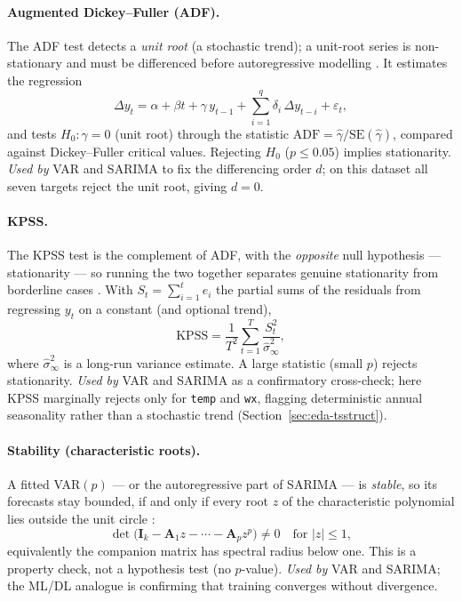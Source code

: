 \documentclass[12pt,a4paper,oneside]{report}
\begin{document}
\paragraph{Augmented Dickey--Fuller (ADF).}
The ADF test detects a \emph{unit root} (a stochastic trend); a unit-root series is
non-stationary and must be differenced before autoregressive modelling
\citep{hamilton1994time}. It estimates the regression
\begin{equation}
  \Delta y_t = \alpha + \beta t + \gamma\, y_{t-1}
  + \sum_{i=1}^{q} \delta_i\,\Delta y_{t-i} + \varepsilon_t,
  \label{eq:adf}
\end{equation}
and tests $H_0\!:\gamma = 0$ (unit root) through the statistic
$\mathrm{ADF} = \hat\gamma / \mathrm{SE}(\hat\gamma)$, compared against
Dickey--Fuller critical values. Rejecting $H_0$ ($p \le 0.05$) implies stationarity.
\emph{Used by} VAR and SARIMA to fix the differencing order $d$; on this dataset all
seven targets reject the unit root, giving $d=0$.

\paragraph{KPSS.}
The KPSS test is the complement of ADF, with the \emph{opposite} null hypothesis ---
stationarity --- so running the two together separates genuine stationarity from
borderline cases \citep{hyndman2021fpp}. With $S_t = \sum_{i=1}^{t} \hat e_i$ the
partial sums of the residuals from regressing $y_t$ on a constant (and optional
trend),
\begin{equation}
  \mathrm{KPSS} = \frac{1}{T^2}\sum_{t=1}^{T} \frac{S_t^2}{\hat\sigma^2_{\infty}},
  \label{eq:kpss}
\end{equation}
where $\hat\sigma^2_{\infty}$ is a long-run variance estimate. A large statistic
(small $p$) rejects stationarity. \emph{Used by} VAR and SARIMA as a confirmatory
cross-check; here KPSS marginally rejects only for \texttt{temp} and \texttt{wx},
flagging deterministic annual seasonality rather than a stochastic trend
(Section~\ref{sec:eda-tsstruct}).

\paragraph{Stability (characteristic roots).}
A fitted VAR$(p)$ --- or the autoregressive part of SARIMA --- is \emph{stable}, so
its forecasts stay bounded, if and only if every root $z$ of the characteristic
polynomial lies outside the unit circle \citep{lutkepohl2005var}:
\begin{equation}
  \det\!\big(\mathbf{I}_k - \mathbf{A}_1 z - \cdots - \mathbf{A}_p z^p\big) \neq 0
  \quad\text{for } |z| \le 1,
  \label{eq:stability}
\end{equation}
equivalently the companion matrix has spectral radius below one. This is a property
check, not a hypothesis test (no $p$-value). \emph{Used by} VAR and SARIMA; the ML/DL
analogue is confirming that training converges without divergence.
\end{document}
